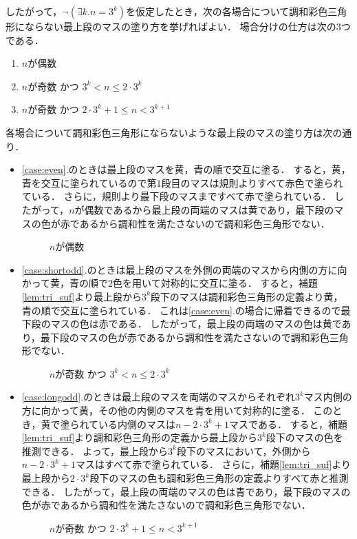したがって，$\lnot(\exists k.n=3^k)$を仮定したとき，次の各場合について調和彩色三角形にならない最上段のマスの塗り方を挙げればよい．
場合分けの仕方は次の$3$つである．
\begin{enumerate}
\item \label{case:even}
  $n$が偶数
\item \label{case:shortodd}
  $n$が奇数 かつ $3^{k} < n \leq 2 \cdot 3^{k}$
\item \label{case:longodd}
  $n$が奇数 かつ $2 \cdot 3^{k} + 1 \leq n < 3^{k+1}$
\end{enumerate}
各場合について調和彩色三角形にならないような最上段のマスの塗り方は次の通り．
\begin{itemize}
  \item
    \ref{case:even}.のときは最上段のマスを黄，青の順で交互に塗る．
    すると，黄，青を交互に塗られているので第$1$段目のマスは規則よりすべて赤色で塗られている．
    さらに，規則より最下段のマスまですべて赤で塗られている．
    したがって，$n$が偶数であるから最上段の両端のマスは黄であり，最下段のマスの色が赤であるから調和性を満たさないので調和彩色三角形でない．
    \begin{figure}[h]
      \centering
      
      \caption{$n$が偶数}
      \label{fig:even_steps}
    \end{figure}
  \item
    \ref{case:shortodd}.のときは最上段のマスを外側の両端のマスから内側の方に向かって黄，青の順で$2$色を用いて対称的に交互に塗る．
    すると，補題\ref{lem:tri_suf}より最上段から$3^k$段下のマスは調和彩色三角形の定義より黄，青の順で交互に塗られている．
    これは\ref{case:even}.の場合に帰着できるので最下段のマスの色は赤である．
    したがって，最上段の両端のマスの色は黄であり，最下段のマスの色が赤であるから調和性を満たさないので調和彩色三角形でない．
    \begin{figure}[h]
      \centering
      
      \caption{$n$が奇数 かつ $3^{k} < n \leq 2 \cdot 3^{k}$}
      \label{fig:shortodd_steps}
    \end{figure}
  \item
    \ref{case:longodd}.のときは最上段のマスを両端のマスからそれぞれ$3^k$マス内側の方に向かって黄，その他の内側のマスを青を用いて対称的に塗る．
    このとき，黄で塗られている内側のマスは$n-2\cdot3^k+1$マスである．
    すると，補題\ref{lem:tri_suf}より調和彩色三角形の定義から最上段から$3^k$段下のマスの色を推測できる．
    よって，最上段から$3^k$段下のマスにおいて，外側から$n-2\cdot3^k+1$マスはすべて赤で塗られている．
    さらに，補題\ref{lem:tri_suf}より最上段から$2\cdot3^k$段下のマスの色も調和彩色三角形の定義よりすべて赤と推測できる．
    したがって，最上段の両端のマスの色は青であり，最下段のマスの色が赤であるから調和性を満たさないので調和彩色三角形でない．
    \begin{figure}[h]
      \centering
      
      \caption{$n$が奇数 かつ $2 \cdot 3^{k} + 1 \leq n < 3^{k+1}$}
      \label{fig:longodd_steps}
    \end{figure}
\end{itemize}
\newpage

